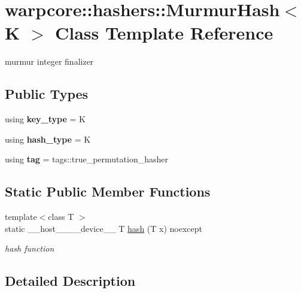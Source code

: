 \hypertarget{classwarpcore_1_1hashers_1_1MurmurHash}{}\section{warpcore\+:\+:hashers\+:\+:Murmur\+Hash$<$ K $>$ Class Template Reference}
\label{classwarpcore_1_1hashers_1_1MurmurHash}


murmur integer finalizer  


\subsection*{Public Types}
\begin{DoxyCompactItemize}
\item 
\mbox{\label{classwarpcore_1_1hashers_1_1MurmurHash_a5ef1db33365a012c05d3f1684d61d701}} 
using {\bfseries key\+\_\+type} = K
\item 
\mbox{\label{classwarpcore_1_1hashers_1_1MurmurHash_a158929bb0d2e8621bf365d638e3e9339}} 
using {\bfseries hash\+\_\+type} = K
\item 
\mbox{\label{classwarpcore_1_1hashers_1_1MurmurHash_a8d6537364c7ddd3656059ba00e6cc975}} 
using {\bfseries tag} = tags\+::true\+\_\+permutation\+\_\+hasher
\end{DoxyCompactItemize}
\subsection*{Static Public Member Functions}
\begin{DoxyCompactItemize}
\item 
{\footnotesize template$<$class T $>$ }\\static \+\_\+\+\_\+host\+\_\+\+\_\+\+\_\+\+\_\+device\+\_\+\+\_\+ T \hyperlink{classwarpcore_1_1hashers_1_1MurmurHash_aa54d11b7c827b9d62c77dda71e505047}{hash} (T x) noexcept
\begin{DoxyCompactList}\small\item\em hash function \end{DoxyCompactList}\end{DoxyCompactItemize}


\subsection{Detailed Description}
